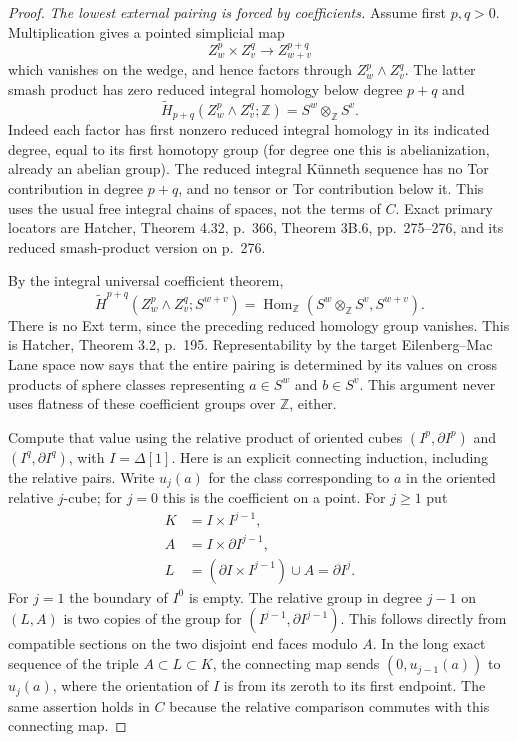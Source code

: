 \begin{proof}
\emph{The lowest external pairing is forced by coefficients.}
Assume first $p,q>0$. Multiplication gives a pointed
simplicial map
\[
 Z^p_w\times Z^q_v\longrightarrow Z^{p+q}_{w+v}
\]
which vanishes on the wedge, and hence factors through
$Z^p_w\wedge Z^q_v$. The latter smash product has
zero reduced integral homology below degree $p+q$
and
\[
 \widetilde H_{p+q}(Z^p_w\wedge Z^q_v;\mathbb Z)
                         = S^w\otimes_{\mathbb Z}S^v.
                                                               \tag{136.M7}
\]
Indeed each factor has first nonzero reduced integral
homology in its indicated degree, equal to its first
homotopy group (for degree one this is abelianization,
already an abelian group). The reduced integral
K\"unneth sequence has no Tor contribution in degree
$p+q$, and no tensor or Tor contribution below it.
This uses the usual free integral chains of spaces,
not the terms of $C$. Exact primary locators are
Hatcher, Theorem 4.32, p.~366, Theorem 3B.6,
pp.~275--276, and its reduced smash-product version
on p.~276.

By the integral universal coefficient theorem,
\[
 \widetilde H^{p+q}(Z^p_w\wedge Z^q_v;S^{w+v})
   =\operatorname{Hom}_{\mathbb Z}
                      (S^w\otimes_{\mathbb Z}S^v,S^{w+v}).
                                                               \tag{136.M8}
\]
There is no Ext term, since the preceding reduced
homology group vanishes. This is Hatcher, Theorem 3.2,
p.~195. Representability by the target Eilenberg--Mac
Lane space now says that the entire pairing is
determined by its values on cross products of sphere
classes representing $a\in S^w$ and $b\in S^v$.
This argument never uses flatness of these coefficient
groups over $\mathbb Z$, either.

Compute that value using the relative product of
oriented cubes $(I^p,\partial I^p)$ and
$(I^q,\partial I^q)$, with $I=\Delta[1]$.
Here is an explicit connecting induction, including
the relative pairs. Write $u_j(a)$ for the class
corresponding to $a$ in the oriented relative $j$-cube;
for $j=0$ this is the coefficient on a point. For
$j\ge1$ put
\[
 \begin{split}
 K&=I\times I^{j-1},\\
 A&=I\times\partial I^{j-1},\\
 L&=(\partial I\times I^{j-1})\cup A=\partial I^j.
 \end{split}
                                                               \tag{136.M9a}
\]
For $j=1$ the boundary of $I^0$ is empty. The
relative group in degree $j-1$ on $(L,A)$ is two
copies of the group for $(I^{j-1},\partial I^{j-1})$.
This follows directly from compatible sections on
the two disjoint end faces modulo $A$. In the long
exact sequence of the triple $A\subset L\subset K$,
the connecting map sends
$(0,u_{j-1}(a))$ to $u_j(a)$, where the orientation
of $I$ is from its zeroth to its first endpoint.
The same assertion holds in $C$ because the relative
comparison commutes with this connecting map.


\end{proof}
